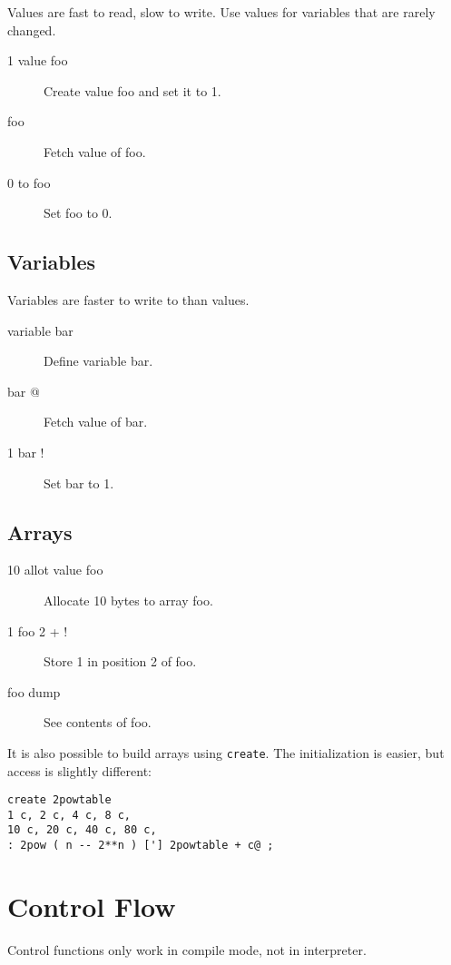 Values are fast to read, slow to write. Use values for variables
that are rarely changed. 

\begin{description}
\item[1 value foo] Create value foo and set it to 1.
\item[foo] Fetch value of foo.
\item[0 to foo] Set foo to 0.
\end{description}

\subsection{Variables}

Variables are faster to write to than values.

\begin{description}
\item[variable bar] Define variable bar.
\item[bar @] Fetch value of bar.
\item[1 bar !] Set bar to 1.
\end{description}

\subsection{Arrays}

\begin{description}
\item[10 allot value foo] Allocate 10 bytes to array foo.
\item[1 foo 2 + !] Store 1 in position 2 of foo.
\item[foo dump] See contents of foo.
\end{description}

It is also possible to build arrays using \texttt{create}. The initialization is easier, but access is slightly different:

\begin{verbatim}
create 2powtable
1 c, 2 c, 4 c, 8 c,
10 c, 20 c, 40 c, 80 c,
: 2pow ( n -- 2**n ) ['] 2powtable + c@ ;
\end{verbatim}

\section{Control Flow}

Control functions only work in compile mode, not in interpreter.

